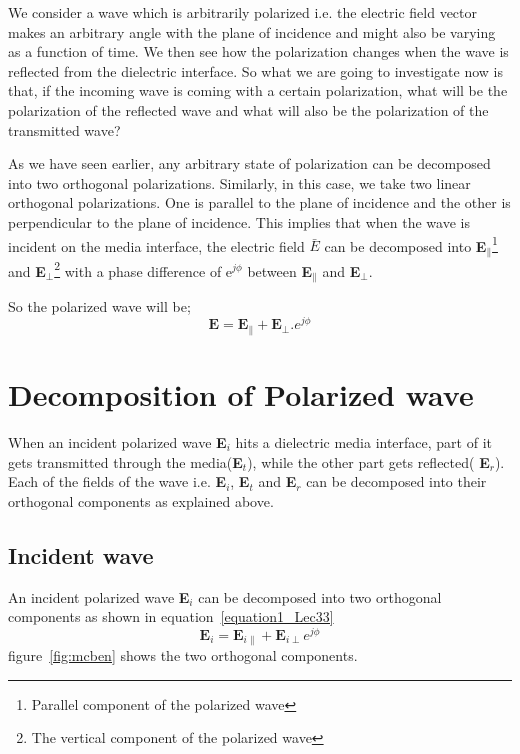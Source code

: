 We consider a wave which is arbitrarily polarized i.e. the electric field vector makes an arbitrary angle with the plane of incidence and might also be varying as a function of time. We then see how the polarization changes when the wave is reflected from the dielectric interface. So what we are going to investigate now is that, if the incoming wave is coming with a certain polarization, what will be the polarization of the reflected wave and what will also be the polarization of the transmitted wave?

As we have seen earlier, any arbitrary state of polarization can be decomposed into two orthogonal polarizations. Similarly, in this case, we take two linear orthogonal polarizations. One is parallel to the plane of incidence and the other is perpendicular to the plane of incidence. This implies that when the wave is incident on the media interface, the electric field \textbf{$\bar{E}$} can be decomposed into \textbf{E}$_\parallel$\footnote{
Parallel component of the polarized wave
} and \textbf{E}$_\perp$\footnote{
The vertical component of the polarized wave
} with a phase difference of e$^{j\phi}$ between \textbf{E}$_\parallel$ and \textbf{E}$_\perp$.

So the polarized wave will be; $$\textbf{E} = \textbf{E}_\parallel + \textbf{E}_\perp.e^{j\phi}$$	

\section{Decomposition of Polarized wave}	
When an incident polarized wave \textbf{E$_i$} hits a dielectric media interface, part of it gets transmitted through the media(\textbf{E$_t$}), while the other part gets reflected( \textbf{E$_r$}). Each of the fields of the wave i.e. \textbf{E$_i$}, \textbf{E$_t$} and \textbf{E$_r$} can be decomposed into their orthogonal components as explained above.	
\subsection{Incident wave}	
An incident polarized wave \textbf{E$_i$} can be decomposed into two orthogonal components as shown in equation~\ref{equation1_Lec33}	
\begin{equation}
\textbf{E}_i = \textbf{E}_{i\parallel} + \textbf{E}_{i\perp} e^{j\phi}
\label{equation1_Lec33}
\end{equation}
figure~\ref{fig:mcben} shows the two orthogonal components.	
